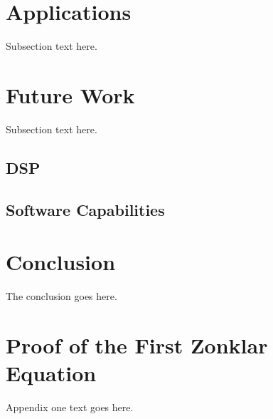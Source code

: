 \documentclass[journal]{IEEEtran}
\begin{document}
\section{Applications}
Subsection text here.

\section{Future Work}
Subsection text here.
\subsection{DSP}
\subsection{Software Capabilities}

\section{Conclusion}
The conclusion goes here.


%

\appendices
\section{Proof of the First Zonklar Equation}
Appendix one text goes here.
\end{document}
